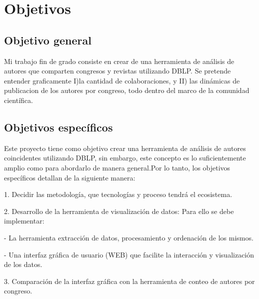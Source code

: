\documentclass[a4paper, 12pt]{book}
\begin{document}

\cleardoublepage %
\chapter{Objetivos} %
\label{chap:objetivos} %

\section{Objetivo general} %
\label{sec:objetivo-general} %


Mi trabajo fin de grado consiste en crear de una herramienta de análisis de autores que comparten congresos y revistas utilizando DBLP.
Se pretende entender graficamente I)la cantidad de colaboraciones, y II) las dinámicas de publicacion de los autores por congreso, todo dentro
del marco de la comunidad científica.



\section{Objetivos específicos}
\label{sec:objetivos-especificos}

Este proyecto tiene como objetivo crear una herramienta de análisis de autores coincidentes utilizando DBLP, sin embargo, 
este concepto es lo suficientemente amplio como para abordarlo de manera general.Por lo tanto, los objetivos específicos detallan
de la siguiente manera:

1. Decidir las metodología, que tecnologías y proceso tendrá el ecosistema.

2. Desarrollo de la herramienta de visualización de datos:
Para ello se debe implementar:

- La herramienta extracción de datos, procesamiento y ordenación de los mismos.

- Una interfaz gráfica de usuario (WEB) que facilite la interacción y visualización de los datos.

3. Comparación de la interfaz gráfica con la herramienta de conteo de autores por congreso.
\end{document}
